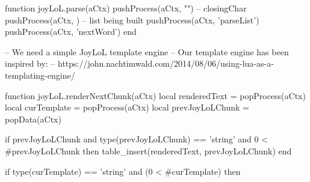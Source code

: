 function joyLoL.parse(aCtx)
  pushProcess(aCtx, "")  -- closingChar
  pushProcess(aCtx, {}) -- list being built
  pushProcess(aCtx, 'parseList')
  pushProcess(aCtx, 'nextWord')
end

-- We need a simple JoyLoL template engine
-- Our template engine has been inspired by:
--   https://john.nachtimwald.com/2014/08/06/using-lua-as-a-templating-engine/

function joyLoL.renderNextChunk(aCtx)
  local renderedText    = popProcess(aCtx)
  local curTemplate     = popProcess(aCtx)
  local prevJoyLoLChunk = popData(aCtx)
  
  if prevJoyLoLChunk
    and type(prevJoyLoLChunk) == 'string'
    and 0 < #prevJoyLoLChunk then
    table_insert(renderedText, prevJoyLoLChunk)
  end
  
  if type(curTemplate) == 'string' and (0 < #curTemplate) then
